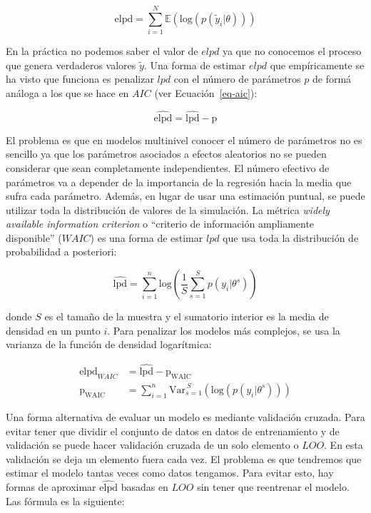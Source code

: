 \documentclass[
  12pt,
  a4paper,
  extrafontsizes,
  onecolumn,
  openright,
  table]{memoir}
\begin{document}
\[
\mathrm{elpd} = \sum_{i=1}^{N} \mathbb{E}(\mathrm{log} (p(\tilde{y}_i | \theta)))
\]

En la práctica no podemos saber el valor de \(elpd\) ya que no conocemos
el proceso que genera verdaderos valores \(\tilde{y}\). Una forma de
estimar \(elpd\) que empíricamente se ha visto que funciona es penalizar
\(lpd\) con el número de parámetros \(p\) de formá análoga a los que se
hace en \(AIC\) (ver Ecuación~\ref{eq-aic}):

\[
\widehat{\mathrm{elpd}} = \widehat{\mathrm{lpd}} - \mathrm{p}
\]

El problema es que en modelos multinivel conocer el número de parámetros
no es sencillo ya que los parámetros asociados a efectos aleatorios no
se pueden considerar que sean completamente independientes. El número
efectivo de parámetros va a depender de la importancia de la regresión
hacia la media que sufra cada parámetro. Además, en lugar de usar una
estimación puntual, se puede utilizar toda la distribución de valores de
la simulación. La métrica \emph{widely available information criterion}
o \enquote{criterio de información ampliamente disponible} (\(WAIC\)) es
una forma de estimar \(lpd\) que usa toda la distribución de
probabilidad a posteriori:

\[
\widehat{\mathrm{lpd}} = \sum_{i=1}^{n} \mathrm{log} (\frac{1}{S} \sum_{s=1}^{S} p(y_{i} | \theta^s))
\]

donde \(S\) es el tamaño de la muestra y el sumatorio interior es la
media de densidad en un punto \(i\). Para penalizar los modelos más
complejos, se usa la varianza de la función de densidad logarítmica:

\[
\begin{aligned}
\widehat{\mathrm{elpd}}_{WAIC} &= \widehat{\mathrm{lpd}} - \mathrm{p_{WAIC}} \\
\mathrm{p_{\mathrm{WAIC}}} &= \sum_{i=1}^{n} \mathrm{Var}_{s=1}^{\,S}(\mathrm{log} (p(y_{i} | \theta^s)))
\end{aligned}
\]

Una forma alternativa de evaluar un modelo es mediante validación
cruzada. Para evitar tener que dividir el conjunto de datos en datos de
entrenamiento y de validación se puede hacer validación cruzada de un
solo elemento o \(LOO\). En esta validación se deja un elemento fuera
cada vez. El problema es que tendremos que estimar el modelo tantas
veces como datos tengamos. Para evitar esto, hay formas de aproximar
\(\widehat{\mathrm{elpd}}\) basadas en \(LOO\) sin tener que reentrenar
el modelo. Las fórmula es la siguiente:
\end{document}
